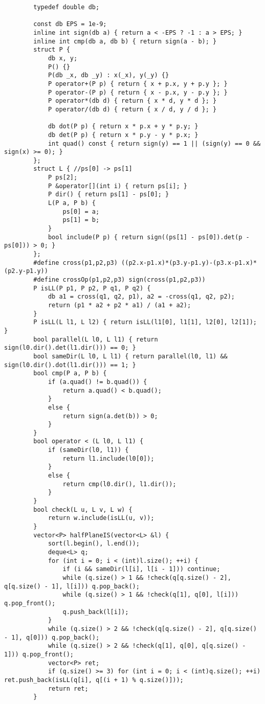 \documentclass[landscape, 8pt, a4paper, oneside, twocolumn]{extarticle}
\begin{document}
	\begin{verbatim}
		typedef double db;
		
		const db EPS = 1e-9;
		inline int sign(db a) { return a < -EPS ? -1 : a > EPS; }
		inline int cmp(db a, db b) { return sign(a - b); }
		struct P {
			db x, y;
			P() {}
			P(db _x, db _y) : x(_x), y(_y) {}
			P operator+(P p) { return { x + p.x, y + p.y }; }
			P operator-(P p) { return { x - p.x, y - p.y }; }
			P operator*(db d) { return { x * d, y * d }; }
			P operator/(db d) { return { x / d, y / d }; }
			
			db dot(P p) { return x * p.x + y * p.y; }
			db det(P p) { return x * p.y - y * p.x; }
			int quad() const { return sign(y) == 1 || (sign(y) == 0 && sign(x) >= 0); }
		};
		struct L { //ps[0] -> ps[1]
			P ps[2];
			P &operator[](int i) { return ps[i]; }
			P dir() { return ps[1] - ps[0]; }
			L(P a, P b) {
				ps[0] = a;
				ps[1] = b;
			}
			bool include(P p) { return sign((ps[1] - ps[0]).det(p - ps[0])) > 0; }
		};
		#define cross(p1,p2,p3) ((p2.x-p1.x)*(p3.y-p1.y)-(p3.x-p1.x)*(p2.y-p1.y))
		#define crossOp(p1,p2,p3) sign(cross(p1,p2,p3))
		P isLL(P p1, P p2, P q1, P q2) {
			db a1 = cross(q1, q2, p1), a2 = -cross(q1, q2, p2);
			return (p1 * a2 + p2 * a1) / (a1 + a2);
		}
		P isLL(L l1, L l2) { return isLL(l1[0], l1[1], l2[0], l2[1]); }
		bool parallel(L l0, L l1) { return sign(l0.dir().det(l1.dir())) == 0; }
		bool sameDir(L l0, L l1) { return parallel(l0, l1) && sign(l0.dir().dot(l1.dir())) == 1; }
		bool cmp(P a, P b) {
			if (a.quad() != b.quad()) {
				return a.quad() < b.quad();
			}
			else {
				return sign(a.det(b)) > 0;
			}
		}
		bool operator < (L l0, L l1) {
			if (sameDir(l0, l1)) {
				return l1.include(l0[0]);
			}
			else {
				return cmp(l0.dir(), l1.dir());
			}
		}
		bool check(L u, L v, L w) {
			return w.include(isLL(u, v));
		}
		vector<P> halfPlaneIS(vector<L> &l) {
			sort(l.begin(), l.end());
			deque<L> q;
			for (int i = 0; i < (int)l.size(); ++i) {
				if (i && sameDir(l[i], l[i - 1])) continue;
				while (q.size() > 1 && !check(q[q.size() - 2], q[q.size() - 1], l[i])) q.pop_back();
				while (q.size() > 1 && !check(q[1], q[0], l[i])) q.pop_front();
				q.push_back(l[i]);
			}
			while (q.size() > 2 && !check(q[q.size() - 2], q[q.size() - 1], q[0])) q.pop_back();
			while (q.size() > 2 && !check(q[1], q[0], q[q.size() - 1])) q.pop_front();
			vector<P> ret;
			if (q.size() >= 3) for (int i = 0; i < (int)q.size(); ++i) ret.push_back(isLL(q[i], q[(i + 1) % q.size()]));
			return ret;
		}
	\end{verbatim}
\end{document}
